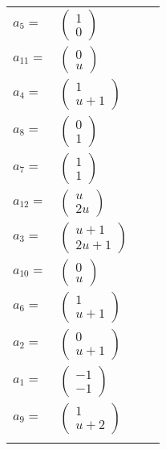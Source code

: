 \documentclass[1p]{elsarticle_modified}
\theoremstyle{definition}
\begin{document}
\begin{tabular}{m{7pt} m{180pt} m{7pt} m{180pt} }
\flushright $a_{5}=$&$\begin{pmatrix}1\\0\end{pmatrix}$ \\
\flushright $a_{11}=$&$\begin{pmatrix}0\\u\end{pmatrix}$ \\
\flushright $a_{4}=$&$\begin{pmatrix}1\\u+1\end{pmatrix}$ \\
\flushright $a_{8}=$&$\begin{pmatrix}0\\1\end{pmatrix}$ \\
\flushright $a_{7}=$&$\begin{pmatrix}1\\1\end{pmatrix}$ \\
\flushright $a_{12}=$&$\begin{pmatrix}u\\2 u\end{pmatrix}$ \\
\flushright $a_{3}=$&$\begin{pmatrix}u+1\\2 u+1\end{pmatrix}$ \\
\flushright $a_{10}=$&$\begin{pmatrix}0\\u\end{pmatrix}$ \\
\flushright $a_{6}=$&$\begin{pmatrix}1\\u+1\end{pmatrix}$ \\
\flushright $a_{2}=$&$\begin{pmatrix}0\\u+1\end{pmatrix}$ \\
\flushright $a_{1}=$&$\begin{pmatrix}-1\\-1\end{pmatrix}$ \\
\flushright $a_{9}=$&$\begin{pmatrix}1\\u+2\end{pmatrix}$\\&\end{tabular}
\end{document}
